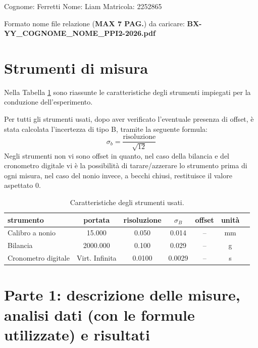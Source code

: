 \documentclass{article}
\title{
\vspace{2in}
\textmd{\textbf{\hmwkClass\ \hmwkTitle}}\\
\vspace{0.3in}
\Large{\textbf{\subt}}\\
\normalsize\vspace{0.1in}\small{\hmwkDueDate}\\
\vspace{0.1in}\large{\textit{\hmwkClassInstructor\ \hmwkClassTime}}
\vspace{3in}
}
\author{\textbf{\hmwkAuthorName}}
\date{} %
\begin{document}
{}\flushleft
\vspace{0.1in}
{\Large Cognome: Ferretti Nome: Liam Matricola: 2252865}
\vspace{0.1in}

\small Formato nome file relazione ({\bf MAX 7 PAG.}) da caricare: {\bf BX-YY\_COGNOME\_NOME\_PPI2-2026.pdf}

\section{Strumenti di misura}

Nella Tabella \ref{tab:infoStrumeni} sono riassunte le caratteristiche degli strumenti impiegati per la conduzione dell'esperimento. 

Per tutti gli strumenti usati, dopo aver verificato l'eventuale presenza di offset, è stata calcolata l'incertezza di tipo B, tramite la seguente formula:
\begin{equation}
	\sigma_b = \frac{\text{risoluzione}}{\sqrt{12}}
	\label{eq:sigma_b}
\end{equation}
Negli strumenti non vi sono offset in quanto, nel caso della bilancia e del cronometro digitale vi è la possibilità di tarare/azzerare lo strumento prima di ogni misura, nel caso del nonio invece, a becchi chiusi, restituisce il valore aspettato 0.

{\def\arraystretch{2}\tabcolsep=12pt
\begin{table}[h!]
	\begin{center}
		\begin{tabular}{|l|ccccc|c}
			\hline
			strumento  & portata & risoluzione & $\sigma_B$ & offset & unit\`a \\
			\hline 
			Calibro a nonio & 15.000  & 0.050 & 0.014 & -- & mm  \\
			\hline
			Bilancia & 2000.000 & 0.100 & 0.029 & -- & g  \\
			\hline
			Cronometro digitale & Virt. Infinita  & 0.0100 & 0.0029& -- & s  \\
			\hline
		\end{tabular}
	\end{center}
	\caption{Caratteristiche degli strumenti usati.}
	\label{tab:infoStrumeni}
\end{table}
}

\newpage


\newpage
\section{Parte 1: descrizione delle misure, analisi dati (con le formule utilizzate) e risultati}
\end{document}
